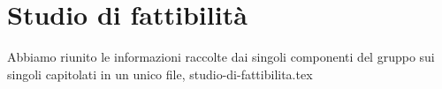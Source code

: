 \documentclass{article}
\begin{document}
\section{Studio di fattibilità}%
\label{sec:studio_di_fattibilità}

Abbiamo riunito le informazioni raccolte dai singoli componenti del gruppo sui singoli capitolati in un unico file, studio-di-fattibilita.tex
\end{document}
